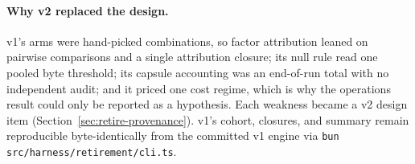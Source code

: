 \paragraph{Why v2 replaced the design.} v1's arms were hand-picked
combinations, so factor attribution leaned on pairwise comparisons and
a single attribution closure; its null rule read one pooled byte
threshold; its capsule accounting was an end-of-run total with no
independent audit; and it priced one cost regime, which is why the
operations result could only be reported as a hypothesis. Each weakness
became a v2 design item (Section~\ref{sec:retire-provenance}). v1's
cohort, closures, and summary remain reproducible byte-identically
from the committed v1 engine via
\texttt{bun src/harness/retirement/cli.ts}.
